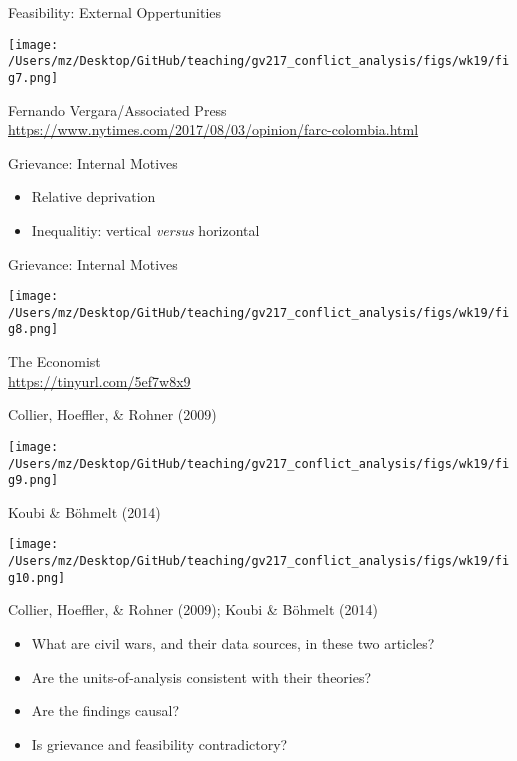 \documentclass[handout]{beamer}
\begin{document}
\begin{frame}{Feasibility: External Oppertunities}
    \begin{center}
        \texttt{[image: /Users/mz/Desktop/GitHub/teaching/gv217\_conflict\_analysis/figs/wk19/fig7.png]}
    \end{center}
    \tiny Fernando Vergara/Associated Press\\ \url{https://www.nytimes.com/2017/08/03/opinion/farc-colombia.html}
\end{frame}

\begin{frame}{Grievance: Internal Motives}
    \begin{itemize}
        \pause\item Relative deprivation
        \pause\item Inequalitiy: vertical \emph{versus} horizontal
    \end{itemize}
\end{frame}

\begin{frame}{Grievance: Internal Motives}
    \pause
    \begin{center}
        \texttt{[image: /Users/mz/Desktop/GitHub/teaching/gv217\_conflict\_analysis/figs/wk19/fig8.png]}
    \end{center}
    \tiny The Economist\\ \url{https://tinyurl.com/5ef7w8x9}
\end{frame}

\begin{frame}{Collier, Hoeffler, \& Rohner (2009)}
    \pause
    \begin{center}
        \texttt{[image: /Users/mz/Desktop/GitHub/teaching/gv217\_conflict\_analysis/figs/wk19/fig9.png]}
    \end{center}
\end{frame}

\begin{frame}{Koubi \& Böhmelt (2014)}
    \pause
    \begin{center}
        \texttt{[image: /Users/mz/Desktop/GitHub/teaching/gv217\_conflict\_analysis/figs/wk19/fig10.png]}
    \end{center}
\end{frame}

\begin{frame}{Collier, Hoeffler, \& Rohner (2009); Koubi \& Böhmelt (2014)}
    \begin{itemize}
        \pause\item What are civil wars, and their data sources, in these two articles?
        \pause\item Are the units-of-analysis consistent with their theories?
        \pause\item Are the findings causal?
        \pause\item Is grievance and feasibility contradictory?
    \end{itemize}
\end{frame}
\end{document}
